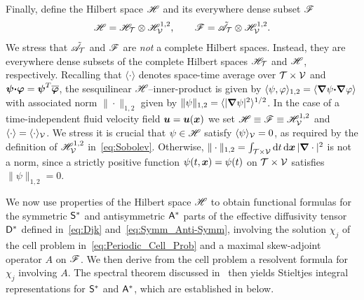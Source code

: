 \documentclass[amsa]{ipart}
\begin{document}
Finally, define the Hilbert space $\mathscr{H}$ and its everywhere dense subset $\mathscr{F}$
%
\begin{align}\label{eq:Function_Space_Scalar}
  \Hs=\Hs_{\Tc}\otimes\Hs^{1,2}_{\Vc}, \qquad
  \Fs=\tilde{\As}_{\Tc}\otimes\Hs^{1,2}_{\Vc}.
\end{align}
%
We stress that $\tilde{\mathscr{A}}_{\mathcal{T}}$ and $\mathscr{F}$ are \emph{not} a
complete Hilbert spaces. Instead, they are everywhere dense subsets of
the complete Hilbert spaces $\mathscr{H}_{\mathcal{T}}$ and $\mathscr{H}$, respectively.
Recalling that $\langle\cdot\rangle$ denotes space-time average over $\mathcal{T}\times\mathcal{V}$ and
$\boldsymbol{\psi}\mbox{\boldmath${\cdot}$}\boldsymbol{\varphi}=\boldsymbol{\psi}^T\overline{\boldsymbol{\varphi}}$, 
the sesquilinear  
$\mathscr{H}$--inner-product is given by $\langle\psi,\varphi\rangle_{1,2}=\left\langle\mbox{\boldmath${\nabla}$} \psi\mbox{\boldmath${\cdot}$}\mbox{\boldmath${\nabla}$} \varphi \right\rangle$ with associated norm
$\|\cdot\|_{1,2}$ given by $\|\psi\|_{1,2}= \langle|\mbox{\boldmath${\nabla}$} \psi|^2\rangle^{1/2}$.
In the case of a 
time-independent fluid velocity field $\boldsymbol{u}=\boldsymbol{u}(\boldsymbol{x})$ we set 
$\mathscr{H}\equiv\mathscr{F}\equiv\mathscr{H}^{1,2}_{\mathcal{V}}$ and $\langle\cdot\rangle=\langle\cdot\rangle_{\mathcal{V}}$.  We stress  it is
crucial that $\psi\in\mathscr{H}$ satisfy $\langle\psi\rangle_{\mathcal{V}}=0$, as required by the
definition of $\mathscr{H}^{1,2}_{\mathcal{V}}$ in~\eqref{eq:Sobolev}. Otherwise,
$\|\cdot\|_{1,2}=\int_{\mathcal{T}\times\mathcal{V}}\mathrm{d} t\,\mathrm{d}\boldsymbol{x}\,|\mbox{\boldmath${\nabla}$}\cdot|^2$ is not a norm,
since a strictly positive function $\psi(t,\boldsymbol{x})=\psi(t)$ on $\mathcal{T}\times\mathcal{V}$
satisfies $\|\psi\|_{1,2}=0$.    





We now use properties of the Hilbert space $\mathscr{H}$ to obtain
functional formulas for the symmetric $\mathsf{S}^*$ and antisymmetric
$\mathsf{A}^*$ parts of the effective diffusivity tensor $\mathsf{D}^*$ defined
in~\eqref{eq:Djk} and~\eqref{eq:Symm_Anti-Symm}, involving
the solution $\chi_j$ of the cell problem
in~\eqref{eq:Periodic_Cell_Prob} and a maximal skew-adjoint 
operator $A$ on $\mathscr{F}$. We then derive from the cell 
problem a resolvent formula for $\chi_j$ involving $A$. The spectral
theorem discussed in~ 
then yields Stieltjes integral representations for
$\mathsf{S}^*$ and $\mathsf{A}^*$, which are established in
 below. 
\end{document}
